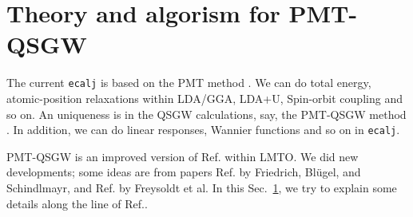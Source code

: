 \documentclass[a4paper,10pt,epsf,fleqn]{article}
\begin{document}



\newpage
\section{Theory and algorism for PMT-QSGW}
\label{sec:theory}
The current {\tt ecalj} is based on the PMT method
\cite{kotani2015pmt,kotani_linearized_2013,pmt1}.
We can do total energy, 
atomic-position relaxations within LDA/GGA, LDA+U, 
Spin-orbit coupling and so on.
An uniqueness is in the QSGW calculations, say, the PMT-QSGW method
\cite{kotani_quasiparticle_2014}. 
In addition, we can do linear responses, Wannier functions and 
so on in {\tt ecalj}.

PMT-QSGW is an improved version of 
Ref.\cite{kotani_quasiparticle_2007} within LMTO.
We did new developments; some ideas are from papers
Ref.\cite{friedrich_efficient_2010} 
by Friedrich, Bl\"ugel, and Schindlmayr,
and Ref.\cite{Freysoldt2007} by Freysoldt et al.
In this Sec.~\ref{sec:theory}, we try to explain some details along
the line of Ref.\cite{kotani_quasiparticle_2014,}.
\end{document}
